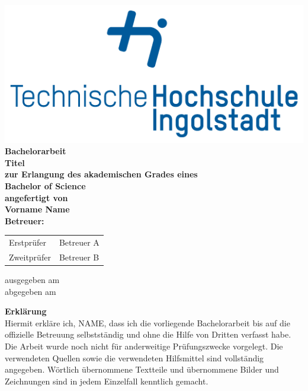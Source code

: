 \documentclass[a4paper, 12pt, oneside, openright]{article}
\begin{document}
\begin{titlepage}
\begin{center}
\centering
\includegraphics[scale=0.3]{thi_logo_wb_RGB}\\
\vspace{1.5cm}
\textbf{\large Bachelorarbeit\\}
\vspace{0.5cm}
\textbf{\LARGE Titel}\\
\vspace{1.0cm}
\textbf{zur Erlangung des akademischen Grades eines\\Bachelor of Science\\}
\vspace{3.0cm}
\textbf{angefertigt von\\Vorname Name\\}
\vspace{3.0cm}
\textbf{Betreuer:\\}
\vspace{0.5cm}
\begin{tabular}{l l}
Erstprüfer & Betreuer A\\
Zweitprüfer & Betreuer B\\           
\end{tabular}
\vfill
ausgegeben am \\
abgegeben am 
\end{center}
\end{titlepage}

{}
\textbf{\Large Erklärung}
\vspace{1.0cm}\\
Hiermit erkläre ich, NAME, dass ich die vorliegende Bachelorarbeit bis auf die offizielle
Betreuung selbstständig und ohne die Hilfe von Dritten verfasst habe. Die Arbeit wurde noch
nicht für anderweitige Prüfungszwecke vorgelegt.
Die verwendeten Quellen sowie die verwendeten Hilfsmittel sind vollständig angegeben. Wörtlich
übernommene Textteile und übernommene Bilder und Zeichnungen sind in jedem Einzelfall
kenntlich gemacht.
\vspace{2.0cm}\\
\end{document}
